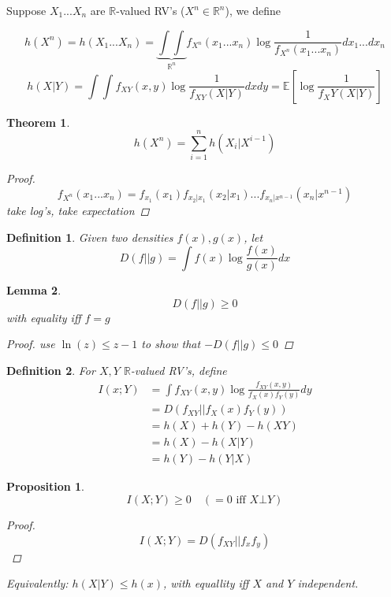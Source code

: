 \documentclass[twoside]{article}
\newtheorem{theorem}{Theorem}[section]
\newtheorem{lemma}[theorem]{Lemma}
\newtheorem{definition}{Definition}[section]
\newtheorem{proposition}{Proposition}[section]
\theoremstyle{definition} %
\newcommand{\Ex}[1]{\mathbb{E}\left[#1\right]}
\def\R{\mathbb{R}}
\begin{document}


Suppose $X_1 ... X_n$ are $\R$-valued RV's ($X^n \in \R^n$), we define

\[
  h(X^n) = h(X_1 ... X_n) = \underbrace{\int \int}_{\R^n} f_{X^n} (x_1 ... x_n) \log \frac{1}{f_{X^n}(x_1 ... x_n)} dx_1...dx_n
\]
\[
  h(X|Y) = \int \int f_{XY}(x, y) \log \frac{1}{f_{XY}(X|Y)} dx dy = \Ex{\log \frac{1}{f_XY(X | Y)}}
\]

\begin{theorem}
  \[
    h(X^n) = \sum_{i = 1}^n h(X_i | X^{i - 1})
  \]
  \begin{proof}
    \[
      f_{X^n}(x_1 ... x_n) = f_{x_1}(x_1) f_{x_2 | x_1}(x_2 | x_1) ... f_{x_n | x^{n-1}}(x_n | x^{n-1})
    \]
    take log's, take expectation
  \end{proof}
\end{theorem}

\begin{definition}
  Given two densities $f(x), g(x)$, let
  \[
    D(f || g) = \int f(x) \log \frac{f(x)}{g(x)} dx
  \]
\end{definition}

\begin{lemma}
  \[
    D(f || g) \geq 0
  \]
  with equality iff $f = g$
  \begin{proof}
    use $\ln(z) \leq z - 1$ to show that $-D(f||g) \leq 0$
  \end{proof}
\end{lemma}

\begin{definition}
  For $X, Y$ $\R$-valued RV's, define
  \begin{align*}
    I(x ; Y) &= \int f_{XY}(x,y) \log \frac{f_{XY}(x, y)}{f_X(x) f_Y(y)} dy \\
    &= D(f_{XY} || f_X(x) f_Y(y)) \\
    &= h(X) + h(Y) - h(XY) \\
    &= h(X) - h(X | Y) \\
    &= h(Y) - h(Y | X)
  \end{align*}
\end{definition}

\begin{proposition}
  \[
    I(X ; Y) \geq 0 \quad (=0 \text{ iff } X \bot Y)
  \]
  \begin{proof}
    \[
      I(X ; Y) = D(f_{XY} || f_x f_y)
    \]
  \end{proof}
  \textit{Equivalently}: $h(X | Y) \leq h(x)$, with equallity iff $X$ and $Y$ independent.
\end{proposition}
\end{document}
